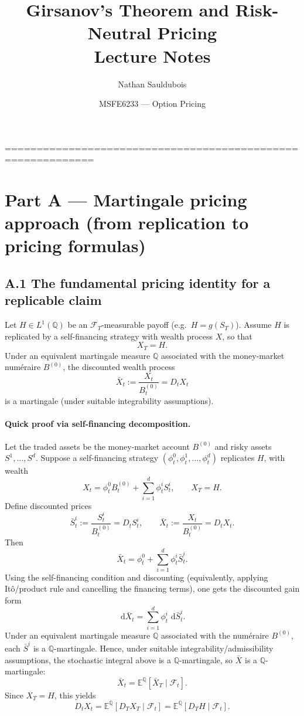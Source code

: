 \documentclass[11pt]{article}
\title{\textbf{Girsanov's Theorem and Risk-Neutral Pricing}\\
\large Lecture Notes}
\author{Nathan Sauldubois}
\date{MSFE6233 --- Option Pricing}
\newcommand{\Qbb}{\mathbb{Q}}
\newcommand{\E}{\mathbb{E}}
\newcommand{\dd}{\,\mathrm{d}}
\newcommand{\1}{\mathbf{1}}
\begin{document}
\maketitle

 ============================================================
\section*{Part A --- Martingale pricing approach (from replication to pricing formulas)}



\subsection*{A.1 The fundamental pricing identity for a replicable claim}

Let \(H\in L^1(\Qbb)\) be an \(\mathcal F_T\)-measurable payoff (e.g.\ \(H=g(S_T)\)).
Assume \(H\) is replicated by a self-financing strategy with wealth process \(X\), so that
$$
X_T = H.
$$
Under an equivalent martingale measure \(\Qbb\) associated with the money-market num\'eraire \(B^{(0)}\),
the discounted wealth process
$$
\bar X_t := \frac{X_t}{B_t^{(0)}} = D_tX_t
$$
is a martingale (under suitable integrability assumptions).

\paragraph{Quick proof via self-financing decomposition.}
Let the traded assets be the money-market account \(B^{(0)}\) and risky assets \(S^1,\dots,S^d\).
Suppose a self-financing strategy \((\phi_t^0,\phi_t^1,\dots,\phi_t^d)\) replicates \(H\), with wealth
$$
X_t=\phi_t^0 B_t^{(0)}+\sum_{i=1}^d \phi_t^i S_t^i,
\qquad X_T=H.
$$
Define discounted prices
$$
\bar S_t^i:=\frac{S_t^i}{B_t^{(0)}}=D_tS_t^i,
\qquad
\bar X_t:=\frac{X_t}{B_t^{(0)}}=D_tX_t.
$$
Then
$$
\bar X_t=\phi_t^0+\sum_{i=1}^d \phi_t^i \bar S_t^i.
$$
Using the self-financing condition and discounting (equivalently, applying It\^o/product rule and cancelling the financing terms), one gets the discounted gain form
$$
\dd \bar X_t=\sum_{i=1}^d \phi_t^i\,\dd \bar S_t^i.
$$
Under an equivalent martingale measure \(\Qbb\) associated with the num\'eraire \(B^{(0)}\), each \(\bar S^i\) is a \(\Qbb\)-martingale. Hence, under suitable integrability/admissibility assumptions, the stochastic integral above is a \(\Qbb\)-martingale, so \(\bar X\) is a \(\Qbb\)-martingale:
$$
\bar X_t=\E^{\Qbb}[\bar X_T\mid\mathcal F_t].
$$
Since \(X_T=H\), this yields
$$
D_tX_t=\E^{\Qbb}[D_TX_T\mid\mathcal F_t]
=\E^{\Qbb}[D_TH\mid\mathcal F_t].
$$
\end{document}
